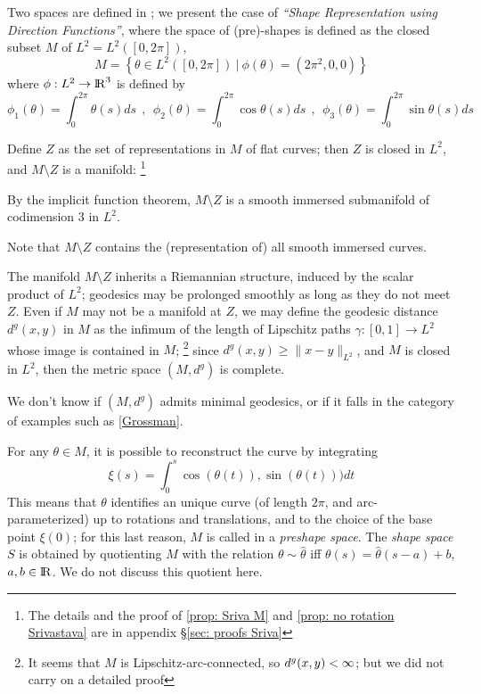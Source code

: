 \documentclass[twoside,a4paper,english]{article}
\begin{document}
\smallskip

Two spaces are defined in \cite{Srivastava:AnalPlan};
we present the case of
\emph{``Shape Representation using Direction Functions''},
where the space of (pre)-shapes is
defined as the closed subset $M$ of $L^2=L^2([0,2\pi])$, 
\[ M=\left\{ \theta\in L^2([0,2\pi]) ~|~ \phi(\theta)=(2\pi^2,0,0) \right\} \]
where $\phi:L^2\to{\protect\mathrm{l\hskip-0.15em R}}^3$ is defined by 
\[ \phi_1(\theta) = \int_0^{2\pi} \theta(s) ds  ~~,~~
   \phi_2(\theta) = \int_0^{2\pi}\!\cos\theta(s) ds ~~,~~
   \phi_3(\theta) = \int_0^{2\pi}\!\sin\theta(s) ds   \]


\smallskip

Define $Z$ as the set of representations  in $M$ of flat curves;
then  $Z$ is closed in $L^2$, and $M\setminus Z$ is a manifold:
\footnote{The details and the proof of \ref{prop: Sriva M}
  and \ref{prop: no rotation Srivastava}
  are in appendix \S\ref{sec: proofs Sriva}}
\begin{Proposition}\label{prop: Sriva M}
  By the implicit function theorem, $M\setminus Z$ is a smooth immersed
  submanifold of codimension 3 in $L^2$.
\end{Proposition}
Note that $M\setminus Z$ contains the (representation of) all smooth
immersed curves.

\smallskip

The manifold $M\setminus Z$ inherits a Riemannian structure, induced
by the scalar product of $L^2$; geodesics may be prolonged smoothly as
long as they do not meet $Z$.  Even if $M$ may not be a manifold at
$Z$, we may define the geodesic distance $d^g(x,y)$ in $M$ as the
infimum of the length of Lipschitz paths $\gamma:[0,1]\to L^2$ whose
image is contained in $M$;%
\footnote{It seems that $M$ is Lipschitz-arc-connected, so
  $d^g(x,y)<\infty$; but we did not carry on a detailed proof} since
$d^g(x,y)\ge \|x-y\|_{L^2}$, and $M$ is closed in ${L^2}$, then the
metric space $(M,d^g)$ is complete.

We don't know if $(M,d^g)$ admits minimal geodesics, or if it
falls in the category of examples such as \ref{Grossman}.

\smallskip

For any $\theta\in M$, it is possible to reconstruct the
curve by integrating
\begin{equation}
  \xi(s) = \int_0^s \cos(\theta(t)),\sin(\theta(t))) dt \label{eq:unlifting}
\end{equation}
This means that $\theta$ identifies an unique curve (of length $2\pi$,
and arc-parameterized) up to
rotations and translations, and to the choice of the base point
$\xi(0)$; for this last reason, $M$ is called in
\cite{Srivastava:AnalPlan} a \emph{preshape space}. 
The \emph{shape space} $S$ is obtained by quotienting $M$
with the relation $\theta\sim \hat\theta$ iff
$\theta(s)=\hat \theta(s-a)+b$, $a,b\in{\protect\mathrm{l\hskip-0.15em R}}$.
We do not discuss this quotient here.
\end{document}
